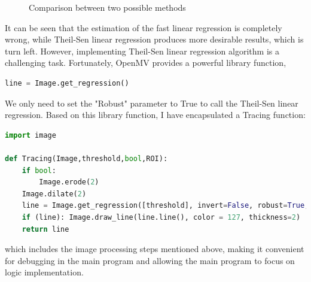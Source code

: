 \documentclass[12pt, a4paper, oneside]{report}
\begin{document}
\begin{figure}[H]
  \centering
  \hspace{0.5cm}
  \caption{Comparison between two possible methods}
  \label{fig:compare}
\end{figure}


It can be seen that the estimation of the fast linear regression is completely wrong, while Theil-Sen linear regression produces more desirable results, which is turn left. However, implementing Theil-Sen linear regression algorithm is a challenging task. Fortunately, OpenMV provides a powerful library function,

\begin{lstlisting}[language=Python]
line = Image.get_regression()

\end{lstlisting}


We only need to set the "Robust" parameter to True to call the Theil-Sen linear regression. Based on this library function, I have encapsulated a Tracing function:

\begin{lstlisting}[language=Python]
import image

def Tracing(Image,threshold,bool,ROI):
    if bool:
        Image.erode(2)
    Image.dilate(2)
    line = Image.get_regression([threshold], invert=False, robust=True, roi=ROI)
    if (line): Image.draw_line(line.line(), color = 127, thickness=2)
    return line

\end{lstlisting}


which includes the image processing steps mentioned above, making it convenient for debugging in the main program and allowing the main program to focus on logic implementation.
\end{document}
